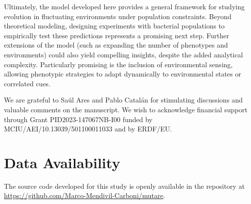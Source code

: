 \documentclass[aps,pre,reprint,10pt,superscriptaddress]{revtex4-2}
\begin{document}
Ultimately, the model developed here provides a general framework for studying evolution in fluctuating environments under population constraints. Beyond theoretical modeling, designing experiments with bacterial populations to empirically test these predictions represents a promising next step. Further extensions of the model (such as expanding the number of phenotypes and environments) could also yield compelling insights, despite the added analytical complexity. Particularly promising is the inclusion of environmental sensing, allowing phenotypic strategies to adapt dynamically to environmental states or correlated cues.

\begin{acknowledgments}
    We are grateful to Sa\'ul Ares and Pablo Catal\'an for stimulating discussions and valuable comments on the manuscript. We wish to acknowledge financial support through Grant PID2023-147067NB-I00 funded by MCIU\slash AEI\slash 10.13039\slash 501100011033 and by ERDF/EU.
\end{acknowledgments}

\section*{Data Availability}
The source code developed for this study is openly available in the repository at \url{https://github.com/Marco-Mendivil-Carboni/mutare}.
\end{document}
